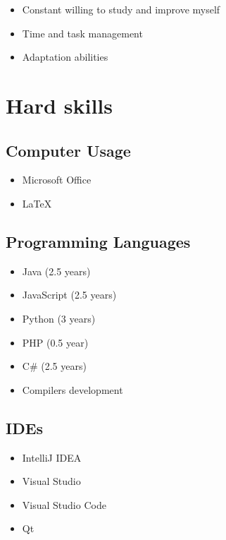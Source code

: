 \documentclass[a4paper,12pt]{article}
\begin{document}
\begin{itemize}
    \item Constant willing to study and improve myself
    \item Time and task management
    \item Adaptation abilities
\end{itemize}

\section*{Hard skills}

\subsection*{Computer Usage}

\begin{itemize}
    \item Microsoft Office
    \item LaTeX 
\end{itemize}

\smallskip

\subsection*{Programming Languages}

\begin{multicols}{2}
\begin{itemize}
    \item Java (2.5 years)
    \item JavaScript (2.5 years)
    \item Python (3 years)
    \item PHP (0.5 year)
    \item C\# (2.5 years)
    \item Compilers development
\end{itemize}
\end{multicols}

\subsection*{IDEs}

\begin{multicols}{2}
\begin{itemize}
    \item IntelliJ IDEA
    \item Visual Studio
    \item Visual Studio Code
    \item Qt
\end{itemize}
\end{multicols}
\end{document}
